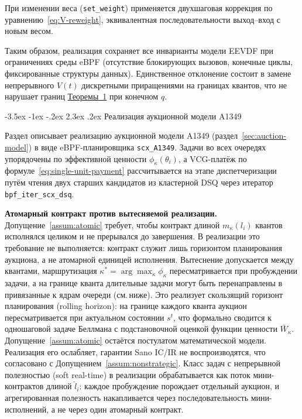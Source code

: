 \documentclass[14pt, oneside]{extbook}
\makeatletter
\renewcommand\section{\@startsection {section}{1}{\z@}%
                                   {-3.5ex \@plus -1ex \@minus -.2ex}%
                                   {2.3ex \@plus.2ex}%
                                   {\normalfont\fontsize{16}{20}\selectfont\bfseries}}
\makeatother
\begin{document}
        При изменении веса (\texttt{set\_weight}) применяется
        двухшаговая коррекция по
        уравнению~\eqref{eq:V-reweight}, эквивалентная
        последовательности выход--вход с новым весом.

        Таким образом, реализация сохраняет все
        инварианты модели EEVDF при ограничениях среды eBPF
        (отсутствие блокирующих вызовов, конечные циклы,
        фиксированные структуры данных). Единственное
        отклонение состоит в замене непрерывного $V(t)$
        дискретными приращениями на границах квантов, что
        не нарушает границ
        \hyperlink{thm:lag-bound}{Теоремы~1} при конечном $q$.


\section{Реализация аукционной модели A1349}\label{sec:a1349-impl}

        Раздел описывает реализацию аукционной модели A1349
        (раздел~\ref{sec:auction-model}) в виде eBPF-планировщика
        \texttt{scx\_A1349}. Задачи во всех очередях упорядочены
        по эффективной ценности $\phi_\kappa(\theta_i)$, а
        VCG-платёж по формуле~\eqref{eq:single-unit-payment}
        рассчитывается на этапе диспетчеризации путём чтения
        двух старших кандидатов из кластерной DSQ через
        итератор \texttt{bpf\_iter\_scx\_dsq}.

        \textbf{Атомарный контракт против вытесняемой реализации.}
        Допущение~\ref{assum:atomic} требует, чтобы контракт
        длиной $m_\kappa(l_i)$ квантов исполнялся целиком и не
        прерывался до завершения. В реализации это требование не
        выполняется: контракт служит лишь горизонтом
        планирования аукциона, а не атомарной единицей
        исполнения. Вытеснение допускается между квантами,
        маршрутизация $\kappa^* = \arg\max_\kappa \phi_\kappa$
        пересматривается при пробуждении задачи, а на границе
        кванта длительные задачи могут быть перенаправлены в
        привязанные к ядрам очереди (см.\,ниже). Это
        реализует скользящий горизонт планирования (rolling
        horizon): на границе каждого кванта аукцион пересматривается
        при актуальном состоянии $s^t$, что формально сводится
        к одношаговой задаче Беллмана с подстановочной оценкой
        функции ценности $\bar W_\kappa$.
        Допущение~\ref{assum:atomic} остаётся постулатом
        математической модели. Реализация его ослабляет, гарантии
        Sano IC/IR не воспроизводятся, что согласовано с
        Допущением~\ref{assum:nonstrategic}. Класс задач с непрерывной полезностью
        (soft real-time) в реализации обрабатывается
        как поток мини-контрактов длиной $\hat l_i$: каждое
        пробуждение порождает отдельный аукцион, и
        агрегированная полезность накапливается через
        последовательность мини-исполнений, а не через один
        атомарный контракт.
\end{document}
